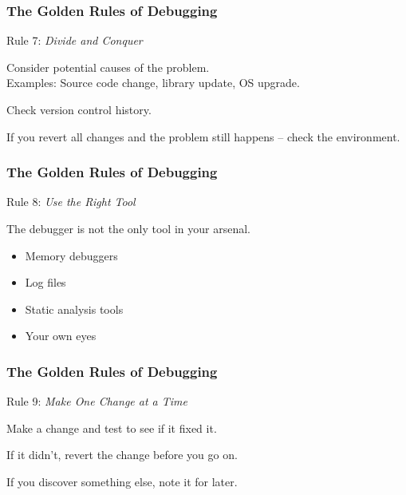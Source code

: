 \begin{frame}
\frametitle{The Golden Rules of Debugging}
\begin{changemargin}{1cm}

Rule 7: \emph{Divide and Conquer}

Consider potential causes of the problem.\\
\quad Examples: Source code change, library update, OS upgrade.

Check version control history. 

If you revert all changes and the problem still happens -- check the environment.

\end{changemargin}
\end{frame}

\begin{frame}
\frametitle{The Golden Rules of Debugging}
\begin{changemargin}{1cm}

Rule 8: \emph{Use the Right Tool}

The debugger is not the only tool in your arsenal.

\begin{itemize}
	\item Memory debuggers
	\item Log files
	\item Static analysis tools
	\item Your own eyes
\end{itemize}

\end{changemargin}
\end{frame}

\begin{frame}
\frametitle{The Golden Rules of Debugging}
\begin{changemargin}{1cm}

Rule 9: \emph{Make One Change at a Time}

Make a change and test to see if it fixed it.

If it didn't, revert the change before you go on.

If you discover something else, note it for later.

\end{changemargin}
\end{frame}


